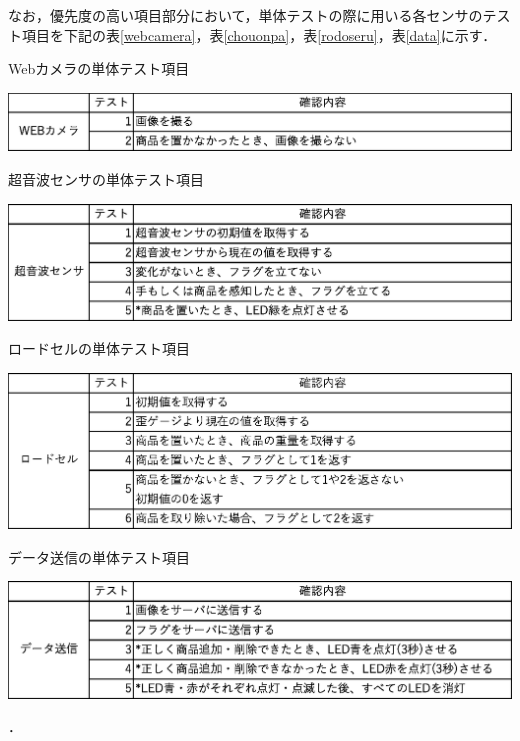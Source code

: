 なお，優先度の高い項目部分において，単体テストの際に用いる各センサのテスト項目を下記の表\ref{webcamera}，表\ref{chouonpa}，表\ref{rodoseru}，表\ref{data}に示す．

\begin{table}[htbp]
\centering
\caption{Webカメラの単体テスト項目}
\includegraphics[width = 15cm]{./picture/webcamera.eps}
\label{webcamera}
\end{table}

\begin{table}[htbp]
\centering
\caption{超音波センサの単体テスト項目}
\includegraphics[width = 15cm]{./picture/chouonpa.eps}
\label{chouonpa}
\end{table}

\begin{table}[htbp]
\centering
\caption{ロードセルの単体テスト項目}
\includegraphics[width = 15cm]{./picture/rodoseru.eps}
\label{rodoseru}
\end{table}

\begin{table}[htbp]
\centering
\caption{データ送信の単体テスト項目}
\includegraphics[width = 15cm]{./picture/data.eps}
\label{data}
\end{table}．


